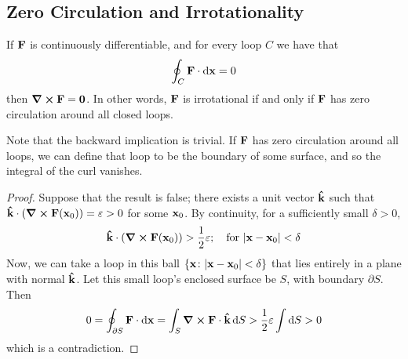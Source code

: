 \subsection{Zero Circulation and Irrotationality}
\begin{proposition}
	If \(\vb F\) is continuously differentiable, and for every loop \(C\) we have that
	\[
		\oint_C \vb F \cdot \dd{\vb x} = 0
	\]
	then \(\curl{\vb F} = \vb 0\).
	In other words, \(\vb F\) is irrotational if and only if \(\vb F\) has zero circulation around all closed loops.
\end{proposition}
\noindent Note that the backward implication is trivial.
If \(\vb F\) has zero circulation around all loops, we can define that loop to be the boundary of some surface, and so the integral of the curl vanishes.
\begin{proof}
	Suppose that the result is false; there exists a unit vector \(\vu{k}\) such that \(\vu{k} \cdot \left( \curl{\vb F(\vb x_0)} \right) = \varepsilon > 0\) for some \(\vb x_0\).
	By continuity, for a sufficiently small \(\delta > 0\),
	\[
		\vu{k} \cdot \left( \curl{\vb F(\vb x_0)} \right) > \frac{1}{2}\varepsilon;\quad \text{for }\abs{\vb x - \vb x_0} < \delta
	\]
	Now, we can take a loop in this ball \(\{ \vb x \colon \abs{\vb x - \vb x_0} < \delta \}\) that lies entirely in a plane with normal \(\vu{k}\).
	Let this small loop's enclosed surface be \(S\), with boundary \(\partial S\).
	Then
	\[
		0 = \oint_{\partial S} \vb F \cdot \dd{\vb x} = \int_S \curl{\vb F} \cdot \vu k \dd{S} > \frac{1}{2}\varepsilon \int \dd{S} > 0
	\]
	which is a contradiction.
\end{proof}

